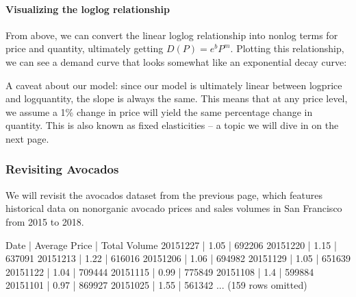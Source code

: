 \documentclass[letterpaper,10pt,english]{jupyterBook}
\begin{document}
\paragraph{Visualizing the log\sphinxhyphen{}log relationship}
\label{\detokenize{content/01-demand/03-log-log:visualizing-the-log-log-relationship}}
\sphinxAtStartPar
From above, we can convert the linear log\sphinxhyphen{}log relationship into non\sphinxhyphen{}log terms for price and quantity, ultimately getting \(D(P) = e^bP^m\). Plotting this relationship, we can see a demand curve that looks somewhat like an exponential decay curve:

\noindent{}

\sphinxAtStartPar
A caveat about our model: since our model is ultimately linear between log\sphinxhyphen{}price and log\sphinxhyphen{}quantity, the slope is always the same. This means that at any price level, we assume a 1\% change in price will yield the same percentage change in quantity. This is also known as fixed elasticities – a topic we will dive in on the next page.


\subsubsection{Revisiting Avocados}
\label{\detokenize{content/01-demand/03-log-log:revisiting-avocados}}
\sphinxAtStartPar
We will revisit the avocados dataset from the previous page, which features historical data on non\sphinxhyphen{}organic avocado prices and sales volumes in San Francisco from 2015 to 2018.

\begin{sphinxVerbatim}[commandchars=\\\{\}]
   
\end{sphinxVerbatim}

\begin{sphinxVerbatim}[commandchars=\\\{\}]
Date       | Average Price | Total Volume
2015\PYGZhy{}12\PYGZhy{}27 | 1.05          | 692206
2015\PYGZhy{}12\PYGZhy{}20 | 1.15          | 637091
2015\PYGZhy{}12\PYGZhy{}13 | 1.22          | 616016
2015\PYGZhy{}12\PYGZhy{}06 | 1.06          | 694982
2015\PYGZhy{}11\PYGZhy{}29 | 1.05          | 651639
2015\PYGZhy{}11\PYGZhy{}22 | 1.04          | 709444
2015\PYGZhy{}11\PYGZhy{}15 | 0.99          | 775849
2015\PYGZhy{}11\PYGZhy{}08 | 1.4           | 599884
2015\PYGZhy{}11\PYGZhy{}01 | 0.97          | 869927
2015\PYGZhy{}10\PYGZhy{}25 | 1.55          | 561342
... (159 rows omitted)
\end{sphinxVerbatim}
\end{document}
